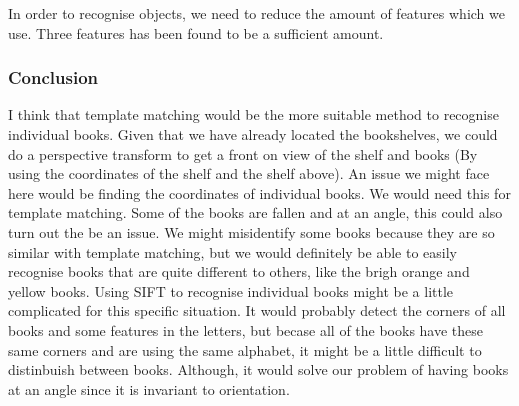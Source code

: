 \documentclass[12pt]{report}
\begin{document}
In order to recognise objects, we need to reduce the amount of features which we use. Three features has been found to be a sufficient amount. 

\subsubsection{Conclusion}
I think that template matching would be the more suitable method to recognise individual books. Given that we have already located the bookshelves, we could do a perspective transform to get a front on view of the shelf and books (By using the coordinates of the shelf and the shelf above). An issue we might face here would be finding the coordinates of individual books. We would need this for template matching. Some of the books are fallen and at an angle, this could also turn out the be an issue. We might misidentify some books because they are so similar with template matching, but we would definitely be able to easily recognise books that are quite different to others, like the brigh orange and yellow books. 
\newline
Using SIFT to recognise individual books might be a little complicated for this specific situation. It would probably detect the corners of all books and some features in the letters, but becase all of the books have these same corners and are using the same alphabet, it might be a little difficult to distinbuish between books. Although, it would solve our problem of having books at an angle since it is invariant to orientation.
\end{document}
